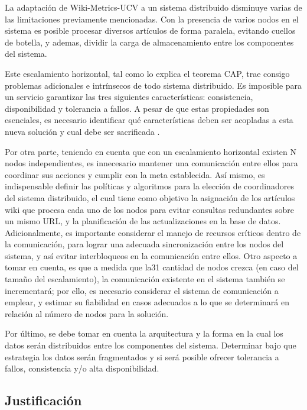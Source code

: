 La adaptación de Wiki-Metrics-UCV a un sistema distribuido disminuye varias de las limitaciones previamente
mencionadas. Con la presencia de varios nodos en el sistema es posible procesar diversos 
artículos de forma paralela, evitando cuellos de botella, y ademas, dividir la carga de almacenamiento 
entre los componentes del sistema.

Este escalamiento horizontal, tal como lo explica el teorema CAP, trae consigo problemas 
adicionales e  intrínsecos de todo sistema distribuido. Es imposible para un servicio garantizar las tres
siguientes características: consistencia, disponibilidad y tolerancia a fallos. A pesar de que estas 
propiedades son esenciales, es necesario identificar qué características deben ser acopladas a
esta nueva solución y cual debe ser sacrificada \cite{6}.

Por otra parte, teniendo en cuenta que con un escalamiento horizontal existen N
nodos independientes, es innecesario mantener una comunicación entre ellos para
coordinar sus acciones y cumplir con la meta establecida. Así mismo, es indispensable
definir las políticas y algoritmos para la elección de coordinadores del sistema
distribuido, el cual tiene como objetivo la asignación de los artículos wiki que procesa
cada uno de los nodos para evitar consultas redundantes sobre un mismo URL, y la
planificación de las actualizaciones en la base de datos. Adicionalmente, es importante
considerar el manejo de recursos críticos dentro de la comunicación, para lograr una
adecuada sincronización entre los nodos del sistema, y así evitar interbloqueos en la
comunicación entre ellos. Otro aspecto a tomar en cuenta, es que a medida que la31
cantidad de nodos crezca (en caso del tamaño del escalamiento), la comunicación
existente en el sistema también se incrementará; por ello, es necesario considerar el
sistema de comunicación a emplear, y estimar su fiabilidad en casos adecuados a lo que
se determinará en relación al número de nodos para la solución.

Por último, se debe tomar en cuenta la arquitectura y la forma en la cual los datos
serán distribuidos entre los componentes del sistema. Determinar bajo que estrategia
los datos serán fragmentados y si será posible ofrecer tolerancia a fallos, consistencia y/o alta
disponibilidad. 

\subsection{Justificación}

